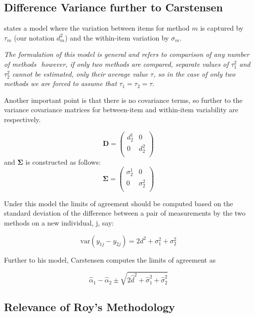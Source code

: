 \documentclass[12pt, a4paper]{article}
\theoremstyle{plain}
\theoremstyle{definition}
\theoremstyle{remark}
\begin{document}




	\subsection{Difference Variance further to Carstensen}
	
	\citet{BXC2008} states a model where the variation between items
	for method $m$ is captured by $\tau_m$ (our notation $d^2_m$) and the within-item
	variation by $\sigma_m$.
	
	\emph{The formulation of this model is general and refers to comparison
		of any number of methods  however, if only two methods are
		compared, separate values of $\tau^2_1$ and $\tau^2_2$ cannot be
		estimated, only their average value $\tau$, so in the case of only
		two methods we are forced to assume that $\tau_1 = \tau_2 = \tau$}\citep{bxc2008}.
	
	Another important point is that there is no covariance terms, so
	further to  \citet{bxc2008} the variance covariance matrices for
	between-item and within-item variability are respectively.
	
	\[\boldsymbol{D} = \left(
	\begin{array}{cc}
	d^1_2  & 0 \\
	0 & d^2_2 \\
	\end{array}
	\right) \]
	and  $\boldsymbol{\Sigma}$ is constructed as follows:
	\[\boldsymbol{\Sigma} = \left(
	\begin{array}{cc}
	\sigma^1_2  & 0 \\
	0 & \sigma^2_2 \\
	\end{array}
	\right) \]
	
	
	Under this model the limits of agreement should be computed based
	on the standard deviation of the difference between a pair of
	measurements by the two methods on a new individual, j, say:
	
	\[ \mbox{var}(y_{1j} - y_{2j}) = 2d^2 + \sigma^2_1 + \sigma^2_2  \]
	
	Further to his model, Carstensen computes the limits of agreement
	as
	
	\[
	\hat{\alpha}_1 - \hat{\alpha}_2 \pm \sqrt{2 \hat{d}^2 + 	\hat{\sigma}^2_1 + \hat{\sigma}^2_2}
	\]
	
	
	\subsection{Relevance of Roy's Methodology}
	
\end{document}
